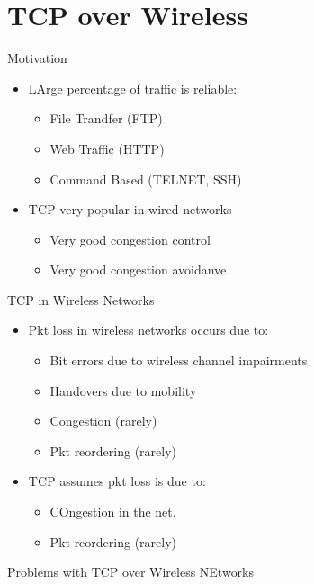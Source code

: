 \documentclass[a4paper]{article}
\begin{document}
\section{TCP over Wireless}
Motivation
\begin{itemize}
	\item LArge percentage of traffic is reliable:
	\begin{itemize}
		\item File Trandfer (FTP)
		\item Web Traffic (HTTP)
		\item Command Based (TELNET, SSH)
	\end{itemize}
	\item TCP very popular in wired networks
	\begin{itemize}
		\item Very good congestion control
		\item Very good congestion avoidanve
	\end{itemize}
\end{itemize}
TCP in Wireless Networks
\begin{itemize}
	\item Pkt loss in wireless networks occurs due to:
	\begin{itemize}
		\item Bit errors due to wireless channel impairments
		\item Handovers due to mobility
		\item Congestion (rarely)
		\item Pkt reordering (rarely)
	\end{itemize}
	\item TCP assumes pkt loss is due to:
	\begin{itemize}
		\item COngestion in the net.
		\item Pkt reordering (rarely)
	\end{itemize}
\end{itemize}
Problems with TCP over Wireless NEtworks
\end{document}
